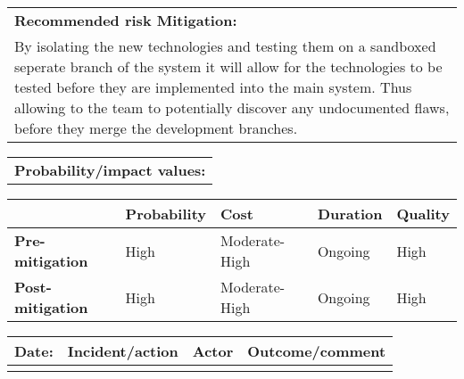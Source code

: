 \begin{table}
\begin{tabularx}{\textwidth}{| X |}
		\hline
		\textbf{Recommended risk Mitigation:} \\ By isolating the new technologies and testing them on a sandboxed seperate branch of the system it will allow for the technologies to be tested before they are implemented into the main system. Thus allowing to the team to potentially discover any undocumented flaws, before they merge the development branches. \\
	\end{tabularx}
	\begin{tabularx}{\textwidth}{| X |}
		\hline
		\textbf{Probability/impact values:} \\
	\end{tabularx}
	\begin{tabularx}{\textwidth}{| l | l | X | X | X |}
		\hline
		 &  \textbf{Probability} & \textbf{Cost} & \textbf{Duration} & \textbf{Quality} \\ \hline
		\textbf{Pre-mitigation} & High & Moderate-High & Ongoing & High \\ \hline
		\textbf{Post-mitigation} & High & Moderate-High & Ongoing & High \\ \hline
	\end{tabularx}
	\begin{tabularx}{\textwidth}{| l | X | l | X |}
		\hline
		\textbf{Date:} & \textbf{Incident/action} & \textbf{Actor} & \textbf{Outcome/comment} \\ \hline
		 &  &  &  \\ \hline
	\end{tabularx}%
\end{table}

